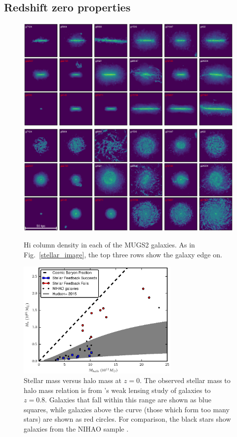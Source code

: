 \subsection{Redshift zero properties}
\begin{figure}
    \includegraphics[width=\textwidth]{figures3/column_edge.eps}
    \includegraphics[width=\textwidth]{figures3/column_face.eps}
    \caption[HI column density images for MUGS2 galaxies]{{\sc Hi} column
    density in each of the MUGS2 galaxies.  As in Fig.~\ref{stellar_image}, the
    top three rows show the galaxy edge on.}
    \label{gas_column}
\end{figure}
\begin{figure}
    \includegraphics[width=0.7\textwidth]{figures3/SMHMR.eps}
    \caption[MUGS2 stellar mass to halo mass relation]{Stellar mass versus halo
    mass at $z=0$.  The observed stellar mass to halo mass relation is from
    \citet{Hudson2015}'s weak lensing study of galaxies to $z=0.8$.  Galaxies
    that fall within this range are shown as blue squares, while galaxies above
    the curve (those which form too many stars) are shown as red circles.  For
    comparison, the black stars show galaxies from the NIHAO sample
    \citep{Wang2015}.}
    \label{SMHMR}
\end{figure}
